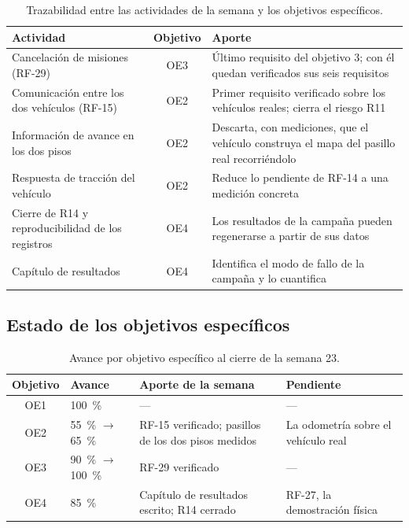\documentclass[12pt,letterpaper]{article}
\begin{document}
\begin{table}[H]
    \centering
    \small
    \caption{Trazabilidad entre las actividades de la semana y los objetivos específicos.}
    \label{tab:trazabilidad}
    \begin{tabular}{@{}p{4.6cm}cp{7.4cm}@{}}
        \toprule
        \textbf{Actividad} & \textbf{Objetivo} & \textbf{Aporte} \\ \midrule
        Cancelación de misiones (RF-29) & OE3 & Último requisito del objetivo 3; con él quedan verificados sus seis requisitos \\ \addlinespace
        Comunicación entre los dos vehículos (RF-15) & OE2 & Primer requisito verificado sobre los vehículos reales; cierra el riesgo R11 \\ \addlinespace
        Información de avance en los dos pisos & OE2 & Descarta, con mediciones, que el vehículo construya el mapa del pasillo real recorriéndolo \\ \addlinespace
        Respuesta de tracción del vehículo & OE2 & Reduce lo pendiente de RF-14 a una medición concreta \\ \addlinespace
        Cierre de R14 y reproducibilidad de los registros & OE4 & Los resultados de la campaña pueden regenerarse a partir de sus datos \\ \addlinespace
        Capítulo de resultados & OE4 & Identifica el modo de fallo de la campaña y lo cuantifica \\ \bottomrule
    \end{tabular}
\end{table}

\subsection{Estado de los objetivos específicos}

\begin{table}[H]
    \centering
    \small
    \caption{Avance por objetivo específico al cierre de la semana 23.}
    \label{tab:objetivos}
    \begin{tabular}{@{}cp{2.8cm}p{4.6cm}p{4.2cm}@{}}
        \toprule
        \textbf{Objetivo} & \textbf{Avance} & \textbf{Aporte de la semana} & \textbf{Pendiente} \\ \midrule
        OE1 & 100~\% & --- & --- \\ \addlinespace
        OE2 & 55~\% $\rightarrow$ 65~\% & RF-15 verificado; pasillos de los dos pisos medidos & La odometría sobre el vehículo real \\ \addlinespace
        OE3 & 90~\% $\rightarrow$ 100~\% & RF-29 verificado & --- \\ \addlinespace
        OE4 & 85~\% & Capítulo de resultados escrito; R14 cerrado & RF-27, la demostración física \\ \bottomrule
    \end{tabular}
\end{table}
\end{document}
